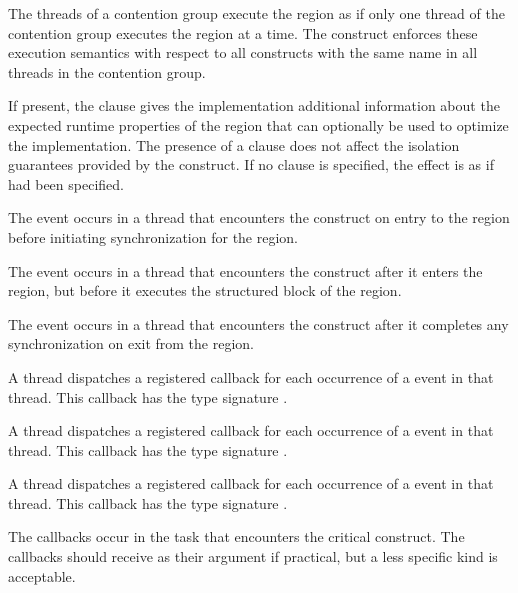 The threads of a contention group execute the  region as if only one 
thread of the contention group executes the  region at a time.
The  construct enforces these execution semantics with respect to all 
 constructs with the same name in all threads in the contention group.

If present, the  clause gives the implementation additional
information about the expected runtime properties of the  region
that can optionally be used to optimize the implementation.
The presence of a  clause does not affect the isolation
guarantees provided by the  construct. If no  
clause is specified, the effect is as if 
had been specified.

\events
The  event occurs in a thread that encounters the
 construct on entry to the  region before
initiating synchronization for the region.

The  event occurs in a thread that encounters the
 construct after it enters the region, but before it executes 
the structured block of the  region.

The  event occurs in a thread that encounters the
 construct after it completes any synchronization on exit 
from the  region.

\tools
A thread dispatches a registered 
callback for each occurrence of a  event
in that thread.
This callback has the type signature .

A thread dispatches a registered 
callback for each occurrence of a  event
in that thread.  This callback has the type signature .

A thread dispatches a registered 
callback for each occurrence of a  event
in that thread.  This callback has the type signature .

The callbacks occur in the task that encounters the critical construct. The 
callbacks should receive  as their  argument 
if practical, but a less specific kind is acceptable.


